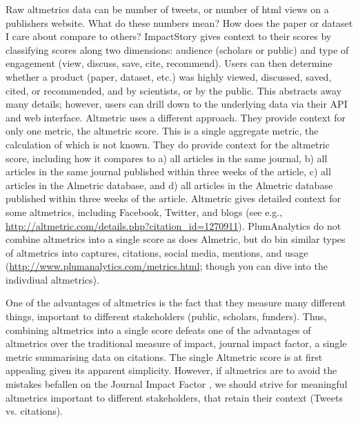 \documentclass[letterpaper,superscriptaddress,showkeys,longbibliography]{revtex4-1}\usepackage{graphicx, color}
\begin{document}
Raw altmetrics data can be number of tweets, or number of html views on a publishers website. What do these numbers mean? How does the paper or dataset I care about compare to others? ImpactStory gives context to their scores by classifying scores along two dimensions: audience (scholars or public) and type of engagement (view, discuss, save, cite, recommend). Users can then determine whether a product (paper, dataset, etc.) was highly viewed, discussed, saved, cited, or recommended, and by scientists, or by the public. This abstracts away many details; however, users can drill down to the underlying data via their API and web interface.  Altmetric uses a different approach. They provide context for only one metric, the altmetric score. This is a single aggregate metric, the calculation of which is not known. They do provide context for the altmetric score, including how it compares to a) all articles in the same journal, b) all articles in the same journal published within three weeks of the article, c) all articles in the Almetric database, and d) all articles in the Almetric database published within three weeks of the article. Altmetric gives detailed context for some altmetrics, including Facebook, Twitter, and blogs (see e.g., \url{http://altmetric.com/details.php?citation_id=1270911}). PlumAnalytics do not combine altmetrics into a single score as does Almetric, but do bin similar types of altmetrics into captures, citations, social media, mentions, and usage (\url{http://www.plumanalytics.com/metrics.html}; though you can dive into the indivdiual altmetrics). 

One of the advantages of altmetrics is the fact that they measure many different things, important to different stakeholders (public, scholars, funders). Thus, combining altmetrics into a single score defeats one of the advantages of altmetrics over the traditional measure of impact, journal impact factor, a single metric summarising data on citations. The single Altmetric score is at first appealing given its apparent simplicity. However, if altmetrics are to avoid the mistakes befallen on the Journal Impact Factor \cite{ploseditorial}, we should strive for meaningful altmetrics important to different stakeholders, that retain their context (Tweets vs. citations). 
\end{document}
